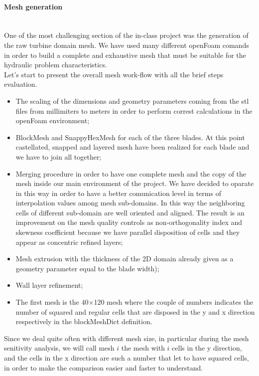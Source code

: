 \documentclass[a4paper,12pt]{article}
\begin{document}
\paragraph{Mesh generation}\mbox{}\\
One of the most challenging section of the in-class project was the generation of the raw turbine domain mesh. We have used many different openFoam comands in order to build a complete and exhaustive mesh that must be suitable for the hydraulic problem characteristics.
\\ 
Let's start to present the overall mesh work-flow with all the brief steps evaluation.
\\
\begin{itemize}
\item The scaling of the dimensions and geometry parameters coming from the stl files from millimiters to meters in order to perform correst calculations in the openFoam environment;

\item BlockMesh and SnappyHexMesh for each of the three blades. At this point castellated, snapped and layered mesh have been realized for each blade and we have to join all together;

\item Merging procedure in order to have one complete mesh and the copy of the mesh inside our main environment of the project. We have decided to oparate in this way in order to have a better comunication level in terms of interpolation values among mesh sub-domains. In this way the neighboring cells of different sub-domain are well oriented and aligned. The result is an improvement on the mesh quality controls as non-orthogonality index and skewness coefficient  because we have parallel disposition of cells and they appear as concentric refined layers;

\item Mesh extrusion with the thickness of the 2D domain already given as a geometry parameter equal to the blade width);

\item Wall layer refinement;

\item The first mesh is the 40$\times$120 mesh where the couple of numbers indicates the number of squared and regular cells that are disposed in the y and x direction respectively in the blockMeshDict definition.  
\end{itemize}

Since we deal quite often with different mesh size, in particular during the mesh senitivity analysis, we will call mesh $i$ the mesh with $i$ cells in the y direction, and the cells in the x direction are such a number that let to have squared cells, in order to make the comparison easier and faster to understand.
\end{document}
